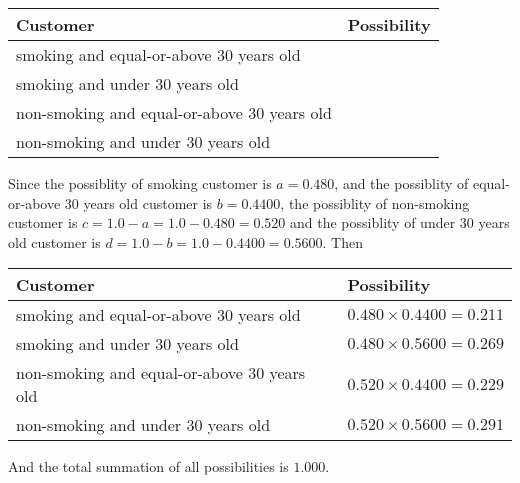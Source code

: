\documentclass[12pt]{article}
\begin{document}
\noindent
\begin{tabular}{|l|l|}
\hline
Customer & Possibility \\
\hline
smoking  and   %
equal-or-above 30 years old  & \\
\hline
smoking  and   %
under 30 years old & \\
\hline
 non-smoking and   %
equal-or-above 30 years old  & \\
\hline
 non-smoking and  %
under 30 years old & \\
\hline
\end{tabular}
 
 
 
 
 
\noindent{}
 
 

Since the possiblity of  %
smoking customer is $ a =  %
0.480 $,
and the possiblity of  %
equal-or-above 30 years old customer is $ b =  %
0.4400 $,
the possiblity of  %
non-smoking customer is $ c = 1.0 - a = 1.0 -
0.480
=  %
0.520 $ and the possiblity of  %
under 30 years old
customer is $ d = 1.0 - b = 1.0 -  %
0.4400 =  %
0.5600  $.
Then
 
\noindent
\begin{tabular}{|l|l|}
\hline
Customer & Possibility \\
\hline
smoking  and  %
equal-or-above 30 years old  &
  $ %
0.480 \times  %
0.4400 =  %
0.211$ \\
\hline
smoking  and  %
under 30 years old &
  $ %
0.480 \times  %
0.5600 =  %
0.269$ \\
\hline
 non-smoking and  %
equal-or-above 30 years old  &
  $ %
0.520 \times  %
0.4400 =  %
0.229$ \\
\hline
 non-smoking and  %
under 30 years old &
  $ %
0.520 \times  %
0.5600 =  %
0.291$ \\
\hline
\end{tabular}
 
\noindent
And the total summation of all possibilities is $  %
1.000 $.
 
 
 
 
\noindent{}
 
 

 
 
 
\noindent{}
 
\end{document}
